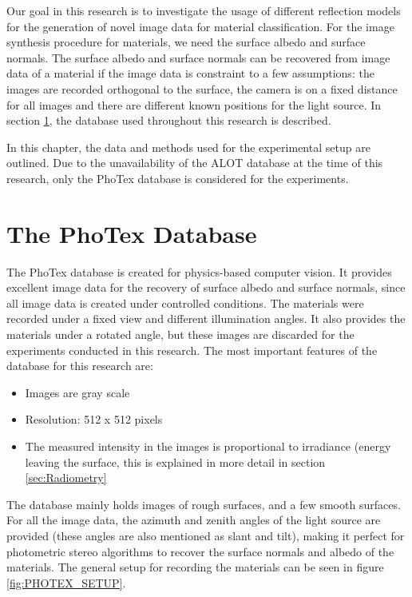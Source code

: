 \hypertarget{Approach}{
}

Our goal in this research is to investigate the usage of different reflection models for the generation of novel image data for material classification. For the image synthesis procedure for materials, we need the surface albedo and surface normals. The surface albedo and surface normals can be recovered from image data of a material if the image data is constraint to a few assumptions: the images are recorded orthogonal to the surface, the camera is on a fixed distance for all images and there are different known positions for the light source. In section \ref{sec:PhoTex}, the database used throughout this research is described.

In this chapter, the data and methods used for the experimental setup are outlined. Due to the unavailability of the ALOT database at the time of this research, only the PhoTex database is considered for the experiments.

\section{The PhoTex Database}\label{sec:PhoTex}
The PhoTex database is created for physics-based computer vision. It provides excellent image data for the recovery of surface albedo and surface normals, since all image data is created under controlled conditions. The materials were recorded under a fixed view and different illumination angles. It also provides the materials under a rotated angle, but these images are discarded for the experiments conducted in this research. The most important features of the database for this research are:

\begin{itemize}
	\item Images are gray scale
	\item Resolution: 512 x 512 pixels
	\item The measured intensity in the images is proportional to irradiance (energy leaving the surface, this is explained in more detail in section \ref{sec:Radiometry} 
\end{itemize}

\noindent The database mainly holds images of rough surfaces, and a few smooth surfaces. For all the image data, the azimuth and zenith angles of the light source are provided (these angles are also mentioned as slant and tilt), making it perfect for photometric stereo algorithms to recover the surface normals and albedo of the materials. The general setup for recording the materials can be seen in figure \ref{fig:PHOTEX_SETUP}. 

